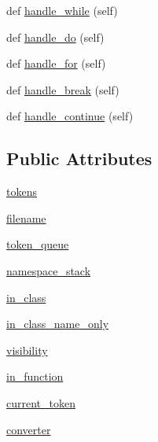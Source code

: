\begin{DoxyCompactItemize}
\item 
def \hyperlink{classcpp_1_1ast_1_1AstBuilder_aac812e812ba2e5fbd80dde93be01a414}{handle\+\_\+while} (self)
\item 
def \hyperlink{classcpp_1_1ast_1_1AstBuilder_a540226b483513b423d4ec2c4f10b18f5}{handle\+\_\+do} (self)
\item 
def \hyperlink{classcpp_1_1ast_1_1AstBuilder_a0025c4d8ca779d69552e0947665eb1c4}{handle\+\_\+for} (self)
\item 
def \hyperlink{classcpp_1_1ast_1_1AstBuilder_a2b663a3e15e70b9d85bf17afb2bcf07a}{handle\+\_\+break} (self)
\item 
def \hyperlink{classcpp_1_1ast_1_1AstBuilder_a511eb003ed301a713a687e5293584077}{handle\+\_\+continue} (self)
\end{DoxyCompactItemize}
\subsection*{Public Attributes}
\begin{DoxyCompactItemize}
\item 
\hyperlink{classcpp_1_1ast_1_1AstBuilder_a1b21f8bef712e91862ccb6b1147cab0d}{tokens}
\item 
\hyperlink{classcpp_1_1ast_1_1AstBuilder_ad8b8f5788de55d6c7151e82af8b21115}{filename}
\item 
\hyperlink{classcpp_1_1ast_1_1AstBuilder_ae167f12797e7c02c1b60c11c83cdb22f}{token\+\_\+queue}
\item 
\hyperlink{classcpp_1_1ast_1_1AstBuilder_ab183aa48e4b6e116379f95eb3d11039c}{namespace\+\_\+stack}
\item 
\hyperlink{classcpp_1_1ast_1_1AstBuilder_a9edc1e10a3f005b463fd9316d83dd15d}{in\+\_\+class}
\item 
\hyperlink{classcpp_1_1ast_1_1AstBuilder_a376583354ab9afa308b7f34105bf3f4a}{in\+\_\+class\+\_\+name\+\_\+only}
\item 
\hyperlink{classcpp_1_1ast_1_1AstBuilder_a2f16b19846c405101235432d2666b614}{visibility}
\item 
\hyperlink{classcpp_1_1ast_1_1AstBuilder_ad5ac0612dfff44241033864832dbdfe3}{in\+\_\+function}
\item 
\hyperlink{classcpp_1_1ast_1_1AstBuilder_a38579523ccc1ae9d202ac722baea45fc}{current\+\_\+token}
\item 
\hyperlink{classcpp_1_1ast_1_1AstBuilder_ae8551cf0405bc6e367636b1f3b37d083}{converter}
\end{DoxyCompactItemize}
